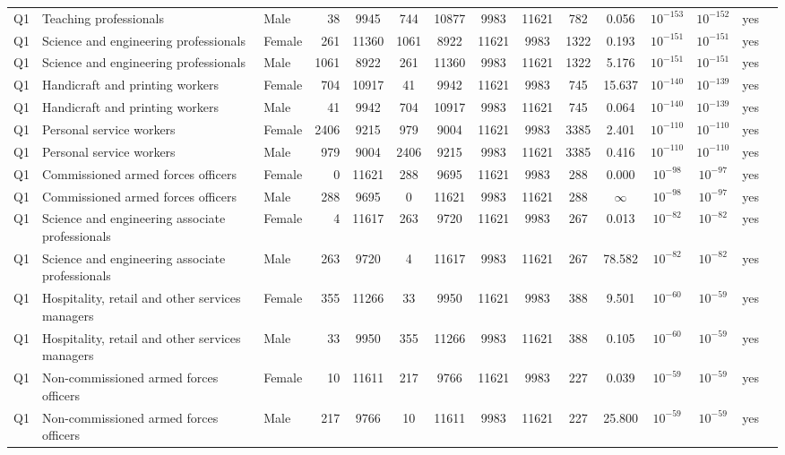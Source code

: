 \begin{longtable}{lllrcccccccccll}
Q1 & Teaching professionals & Male & 38 & 9945 & 744 & 10877 & 9983 & 11621 & 782 & 0.056 & $10^{-153}$ & $10^{-152}$ & yes \\
Q1 & Science and engineering professionals & Female & 261 & 11360 & 1061 & 8922 & 11621 & 9983 & 1322 & 0.193 & $10^{-151}$ & $10^{-151}$ & yes \\
Q1 & Science and engineering professionals & Male & 1061 & 8922 & 261 & 11360 & 9983 & 11621 & 1322 & 5.176 & $10^{-151}$ & $10^{-151}$ & yes \\
Q1 & Handicraft and printing workers & Female & 704 & 10917 & 41 & 9942 & 11621 & 9983 & 745 & 15.637 & $10^{-140}$ & $10^{-139}$ & yes \\
Q1 & Handicraft and printing workers & Male & 41 & 9942 & 704 & 10917 & 9983 & 11621 & 745 & 0.064 & $10^{-140}$ & $10^{-139}$ & yes \\
Q1 & Personal service workers & Female & 2406 & 9215 & 979 & 9004 & 11621 & 9983 & 3385 & 2.401 & $10^{-110}$ & $10^{-110}$ & yes \\
Q1 & Personal service workers & Male & 979 & 9004 & 2406 & 9215 & 9983 & 11621 & 3385 & 0.416 & $10^{-110}$ & $10^{-110}$ & yes \\
Q1 & Commissioned armed forces officers & Female & 0 & 11621 & 288 & 9695 & 11621 & 9983 & 288 & 0.000 & $10^{-98}$ & $10^{-97}$ & yes \\
Q1 & Commissioned armed forces officers & Male & 288 & 9695 & 0 & 11621 & 9983 & 11621 & 288 & $\infty$ & $10^{-98}$ & $10^{-97}$ & yes \\
Q1 & Science and engineering associate professionals & Female & 4 & 11617 & 263 & 9720 & 11621 & 9983 & 267 & 0.013 & $10^{-82}$ & $10^{-82}$ & yes \\
Q1 & Science and engineering associate professionals & Male & 263 & 9720 & 4 & 11617 & 9983 & 11621 & 267 & 78.582 & $10^{-82}$ & $10^{-82}$ & yes \\
Q1 & Hospitality, retail and other services managers & Female & 355 & 11266 & 33 & 9950 & 11621 & 9983 & 388 & 9.501 & $10^{-60}$ & $10^{-59}$ & yes \\
Q1 & Hospitality, retail and other services managers & Male & 33 & 9950 & 355 & 11266 & 9983 & 11621 & 388 & 0.105 & $10^{-60}$ & $10^{-59}$ & yes \\
Q1 & Non-commissioned armed forces officers & Female & 10 & 11611 & 217 & 9766 & 11621 & 9983 & 227 & 0.039 & $10^{-59}$ & $10^{-59}$ & yes \\
Q1 & Non-commissioned armed forces officers & Male & 217 & 9766 & 10 & 11611 & 9983 & 11621 & 227 & 25.800 & $10^{-59}$ & $10^{-59}$ & yes \\

\end{longtable}
